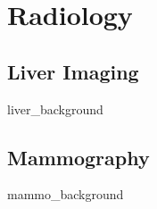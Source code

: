 \chapter{Radiology}


\section{Liver Imaging}
{liver_background}

\section{Mammography}
{mammo_background}